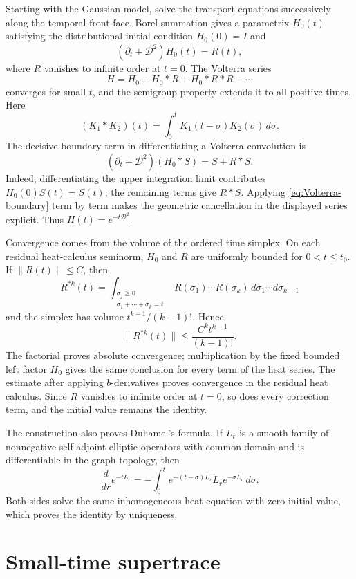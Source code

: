 \documentclass[12pt,oneside,reqno]{article}
\theoremstyle{plain}
\theoremstyle{definition}
\theoremstyle{remark}
\begin{document}
Starting with the Gaussian model, solve the transport equations
successively along the temporal front face. Borel summation gives a
parametrix \(H_0(t)\) satisfying the distributional initial condition
\(H_0(0)=I\) and
\[
 (\partial_t+\mathcal D^2)H_0(t)=R(t),
\]
where \(R\) vanishes to infinite order at \(t=0\). The Volterra series
\[
 H
 =
 H_0-H_0*R+H_0*R*R-\cdots
\]
converges for small \(t\), and the semigroup property extends it to all
positive times. Here
\[
 (K_1*K_2)(t)=\int_0^tK_1(t-\sigma)K_2(\sigma)\,d\sigma.
\]
The decisive boundary term in differentiating a Volterra convolution is
\begin{equation}\label{eq:Volterra-boundary}
 (\partial_t+\mathcal D^2)(H_0*S)
 =S+R*S.
\end{equation}
Indeed, differentiating the upper integration limit contributes
\(H_0(0)S(t)=S(t)\); the remaining terms give \(R*S\).  Applying
\eqref{eq:Volterra-boundary} term by term makes the geometric cancellation
in the displayed series explicit. Thus \(H(t)=e^{-t\mathcal D^2}\).

Convergence comes from the volume of the ordered time simplex. On each
residual heat-calculus seminorm, \(H_0\) and \(R\) are uniformly bounded
for \(0<t\leq t_0\). If \(\|R(t)\|\leq C\), then
\[
 R^{*k}(t)
 =
 \int_{\substack{\sigma_j\geq0\\\sigma_1+\cdots+\sigma_k=t}}
 R(\sigma_1)\cdots R(\sigma_k)\,d\sigma_1\cdots d\sigma_{k-1}
\]
and the simplex has volume \(t^{k-1}/(k-1)!\). Hence
\[
 \|R^{*k}(t)\|
 \leq \frac{C^k t^{k-1}}{(k-1)!}.
\]
The factorial proves absolute convergence; multiplication by the fixed
bounded left factor \(H_0\) gives the same conclusion for every term of the
heat series. The estimate after applying \(b\)-derivatives proves
convergence in the residual heat calculus. Since \(R\) vanishes to infinite
order at \(t=0\), so does every correction term, and the initial value
remains the identity.

The construction also proves Duhamel's formula. If \(L_r\) is a smooth
family of nonnegative self-adjoint elliptic operators with common domain
and is differentiable in the graph topology, then
\[
 \frac{d}{dr}e^{-tL_r}
 =
 -\int_0^t
 e^{-(t-\sigma)L_r}\dot L_r e^{-\sigma L_r}\,d\sigma.
\]
Both sides solve the same inhomogeneous heat equation with zero initial
value, which proves the identity by uniqueness.

\section{Small-time supertrace}
\end{document}
